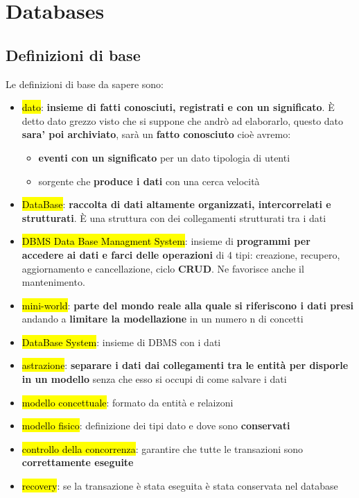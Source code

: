 \newpage
\section{Databases}

\subsection{Definizioni di base}

Le definizioni di base da sapere sono:
\begin{itemize}
	\item \hl{dato}: \textbf{insieme di fatti conosciuti, registrati e con un significato}. È detto dato grezzo visto che si suppone che andrò ad elaborarlo, questo dato \textbf{sara' poi archiviato}, sarà un \textbf{fatto conosciuto} cioè avremo:
		\begin{itemize}
			\item \textbf{eventi con un significato} per un dato tipologia di utenti 
			\item sorgente che \textbf{produce i dati} con una cerca velocità
		\end{itemize}
	
	\item \hl{DataBase}: \textbf{raccolta di dati altamente organizzati, intercorrelati e strutturati}. È una struttura con dei collegamenti strutturati tra i dati

	\item \hl{DBMS Data Base Managment System}: insieme di \textbf{programmi per accedere ai dati e farci delle operazioni} di 4 tipi: creazione, recupero, aggiornamento e cancellazione, ciclo \textbf{CRUD}. Ne favorisce anche il mantenimento.

	\item \hl{mini-world}: \textbf{parte del mondo reale alla quale si riferiscono i dati presi} andando a \textbf{limitare la modellazione} in un numero n di concetti

	\item \hl{DataBase System}: insieme di DBMS con i dati
	
	\item \hl{astrazione}: \textbf{separare i dati dai collegamenti tra le entità per disporle in un modello} senza che esso si occupi di come salvare i dati
	
	\item \hl{modello concettuale}: formato da entità e relaizoni
	
	\item \hl{modello fisico}: definizione dei tipi dato e dove sono \textbf{conservati}
	
	\item \hl{controllo della concorrenza}: garantire che tutte le transazioni sono \textbf{correttamente eseguite}
	
	\item \hl{recovery}: se la transazione è stata eseguita è stata conservata nel database
\end{itemize}


